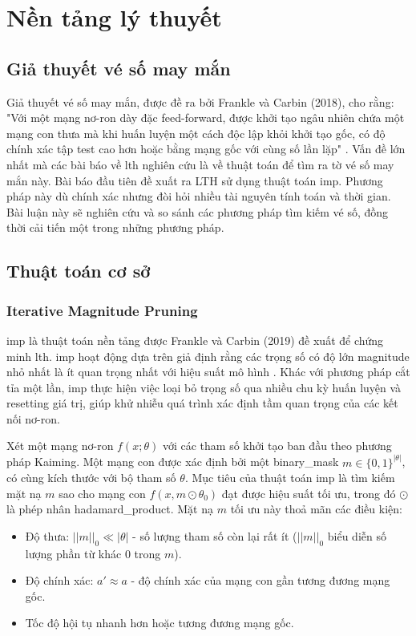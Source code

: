 \chapter{Nền tảng lý thuyết}
\newtheorem{definition}{Định nghĩa}[chapter]
\newtheorem{theorem}{Định lý}[chapter]
\section{Giả thuyết vé số may mắn}
Giả thuyết vé số may mắn, được đề ra bởi Frankle và Carbin (2018), cho rằng: "Với một mạng nơ-ron dày đặc feed-forward, được khởi tạo ngâu nhiên chứa một mạng con thưa mà khi huấn luyện một cách độc lập khỏi khởi tạo gốc, có độ chính xác tập test cao hơn hoặc bằng mạng gốc với cùng số lần lặp" \cite{imp}. Vấn đề lớn nhất mà các bài báo về \gls{lth} nghiên cứu là về thuật toán để tìm ra tờ vé số may mắn này. Bài báo đầu tiên đề xuất ra LTH sử dụng thuật toán \gls{imp}. Phương pháp này dù chính xác nhưng đòi hỏi nhiều tài nguyên tính toán và thời gian. Bài luận này sẽ nghiên cứu và so sánh các phương pháp tìm kiếm vé số, đồng thời cải tiến một trong những phương pháp.
\section{Thuật toán cơ sở}
\subsection{Iterative Magnitude Pruning}
\gls{imp} là thuật toán nền tảng được Frankle và Carbin (2019) đề xuất để chứng minh \gls{lth}. \gls{imp} hoạt động dựa trên giả định rằng các trọng số có độ lớn \gls{magnitude} nhỏ nhất là ít quan trọng nhất với hiệu suất mô hình \cite[p~.1]{fisher}. Khác với phương pháp cắt tỉa một lần, \gls{imp} thực hiện việc loại bỏ trọng số qua nhiều chu kỳ huấn luyện và \gls{resetting} giá trị, giúp khử nhiễu quá trình xác định tầm quan trọng của các kết nối nơ-ron.

Xét một mạng nơ-ron $f(x;\theta)$ với các tham số khởi tạo ban đầu theo phương pháp Kaiming. Một mạng con được xác định bởi một \gls{binary_mask} $m \in \{0, 1\}^{|\theta|}$, có cùng kích thước với bộ tham số $\theta$.
Mục tiêu của thuật toán \gls{imp} là tìm kiếm mặt nạ $m$ sao cho mạng con $f(x, m \odot \theta_0)$ đạt được hiệu suất tối ưu, trong đó $\odot$ là phép nhân \gls{hadamard_product}. Mặt nạ $m$ tối ưu này thoả mãn các điều kiện:
\begin{itemize}
    \item  Độ thưa: $||m||_0 \ll |\theta|$ - số lượng tham số còn lại rất ít ($||m||_0$ biểu diễn số lượng phần từ khác 0 trong $m$).
    \item Độ chính xác: $a' \approx a$ - độ chính xác của mạng con gần tương đương mạng gốc.
    \item Tốc độ hội tụ nhanh hơn hoặc tương đương mạng gốc.
\end{itemize}

